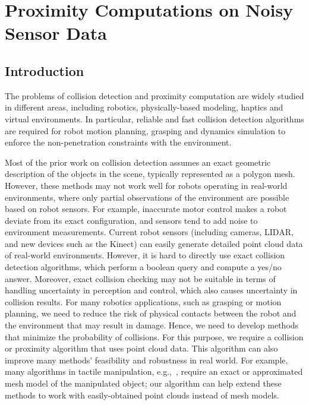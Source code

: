 \chapter{Proximity Computations on Noisy Sensor Data}
\label{chp:PCollide}

\section{Introduction}
The problems of collision detection and proximity computation are widely studied in different areas, including robotics, physically-based modeling, haptics and virtual environments. In particular, reliable and fast collision detection algorithms are required for robot motion planning, grasping and dynamics simulation to enforce the non-penetration constraints with the environment.

Most of the prior work on collision detection assumes an exact geometric description of the objects in the scene, typically represented as a polygon mesh. However, these methods may not work well
for robots operating in real-world environments, where only partial observations of the environment are possible based on robot sensors. For example, inaccurate motor control makes a robot deviate from its
exact configuration, and sensors tend to add noise to environment measurements.
Current robot sensors (including cameras, LIDAR, and new devices such as the Kinect) can easily generate detailed point cloud data of real-world environments. However, it is hard to directly use exact collision detection algorithms, which perform a boolean query and compute a yes/no answer.
Moreover, exact collision checking may not be suitable in terms of
handling uncertainty in perception and control, which also causes uncertainty in collision results.
For many robotics applications, such as grasping or motion planning, we need to reduce the risk
of physical contacts between the robot and the environment that may result in damage. Hence, we need to develop methods that minimize the probability of collisions. For this purpose, we require a collision or proximity algorithm that uses point cloud data. 
This algorithm can also improve many methods' feasibility and robustness in real world. For example, many algorithms in tactile manipulation, e.g.,~\cite{anna:2011}, require an exact or approximated mesh model of the manipulated object; our algorithm can help extend these methods to work with easily-obtained point clouds instead of mesh models.

